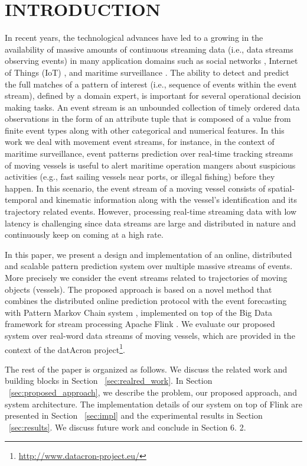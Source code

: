 \section{INTRODUCTION}


In recent years, the technological advances have led to a growing in the availability of massive amounts of continuous streaming data (i.e., data streams observing events) in many application domains such as social networks \cite{mathioudakis2010twittermonitor}, Internet of Things (IoT) \cite{miorandi2012internet}, and maritime surveillance \cite{patroumpas2015event}.  The ability to detect and predict the full matches of a pattern of interest (i.e., sequence of events within the event stream), defined by a domain expert, is important for several operational decision making tasks.
An event stream is an unbounded collection of timely ordered data observations in the form of an attribute tuple that is composed of a value from finite event types along with other categorical and numerical features. In this work we deal with movement event streams, for instance, in the context of maritime surveillance, event patterns prediction over real-time tracking streams of moving vessels is useful to alert maritime operation mangers about suspicious activities (e.g., fast sailing vessels near ports, or illegal fishing) before they happen. In this scenario, the event stream of a moving vessel consists of spatial-temporal and kinematic information along with the vessel's identification and its trajectory related events. However, processing real-time streaming data with low latency is challenging since data streams are large and distributed in nature and continuously keep on coming at a high rate. 
\par In this paper, we present a design and implementation of an online, distributed and scalable pattern prediction system over multiple massive streams of events. More precisely we consider the event streams related to trajectories of moving objects (vessels). The proposed approach is based on a novel method that combines the distributed online prediction protocol \cite{dekel2012optimal,kamp2014communication} with the event forecasting with Pattern Markov Chain system \cite{alevizos2017event}, implemented on top of the Big Data framework for stream processing Apache Flink \cite{Flink}. We evaluate our proposed system over  real-word data streams of moving vessels, which are provided in the context of the datAcron project\footnote{\url{http://www.datacron-project.eu/}}.

\par The rest of the paper is organized as follows. We discuss the related work and building blocks  in Section ~\ref{sec:realred_work}. In Section ~\ref{sec:proposed_approach}, we describe the problem, our proposed approach, and system architecture. The implementation details of our system on top of Flink are presented in Section ~\ref{sec:impl} and the experimental results in Section ~\ref{sec:results}. We discuss future work and conclude in Section 6.
2.
